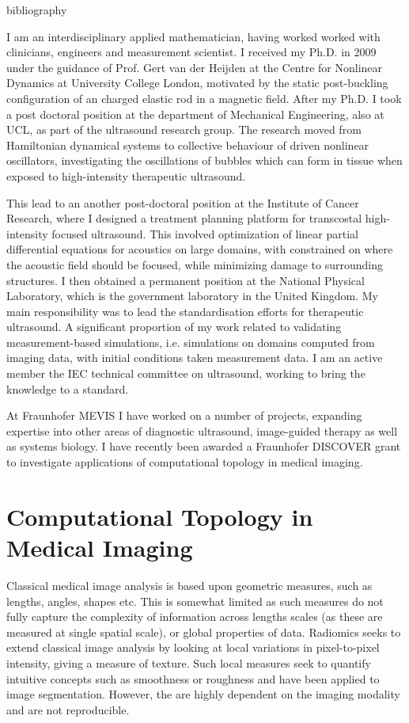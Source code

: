  
\begin{btUnit}
\begin{btSect}{bibliography} 

I am an interdisciplinary applied mathematician, having worked worked with clinicians, engineers and measurement scientist. I received my Ph.D. in 2009 under the guidance of Prof. Gert van der Heijden at the Centre for Nonlinear Dynamics at University College London, motivated by the static post-buckling configuration of an charged elastic rod in a magnetic field. After my Ph.D. I took a post doctoral position at the department of Mechanical Engineering, also at UCL, as part of the ultrasound research group. The research moved from Hamiltonian dynamical systems to collective behaviour of driven nonlinear oscillators, investigating the oscillations of bubbles which can form in tissue when exposed to high-intensity therapeutic ultrasound.

This lead to an another post-doctoral position at the Institute of Cancer Research, where I designed a treatment planning platform for transcostal high-intensity focused ultrasound. This involved optimization of linear partial differential equations for acoustics on large domains, with constrained on where the acoustic field should be focused, while minimizing damage to surrounding structures. I then obtained a permanent position at the National Physical Laboratory, which is the government laboratory in the United Kingdom. My main responsibility was to lead the standardisation efforts for therapeutic ultrasound. A significant proportion of my work related to validating measurement-based simulations, i.e. simulations on domains computed from imaging data, with initial conditions taken measurement data. I am an active member the IEC technical committee on ultrasound, working to bring the knowledge to a standard. 

At Fraunhofer MEVIS I have worked on a number of projects, expanding expertise into other areas of diagnostic ultrasound, image-guided therapy as well as systems biology. I have recently been awarded a Fraunhofer DISCOVER grant to investigate applications of computational topology in medical imaging.

\section{Computational Topology in Medical Imaging}

Classical medical image analysis is based upon geometric measures, such as lengths, angles, shapes etc. This is somewhat limited as such measures do not fully capture the complexity of information across lengths scales (as these are measured at single spatial scale), or global properties of data. Radiomics seeks to extend classical image analysis by looking at local variations in pixel-to-pixel intensity, giving a measure of texture. Such local measures seek to quantify intuitive concepts such as smoothness or roughness and have been applied to image segmentation. However, the are highly dependent on the imaging modality and are not reproducible. 


\end{btSect}
\end{btUnit}
